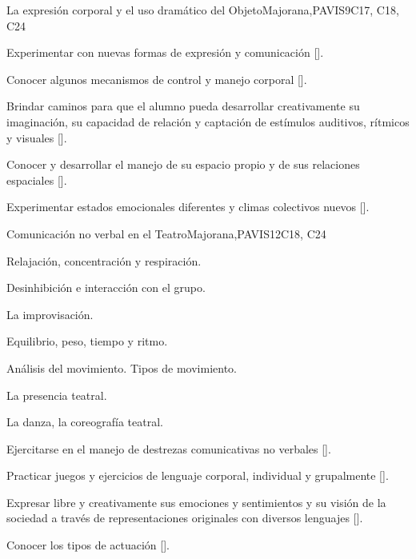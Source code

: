 \begin{syllabus}
\begin{unit}{}{La expresión corporal y el uso dramático del Objeto}{Majorana,PAVIS}{9}{C17, C18, C24}
\begin{topics}
\end{topics}
\begin{learningoutcomes}
	\item Experimentar con nuevas formas de expresión y comunicación [\Usage].
	\item Conocer algunos mecanismos de control y manejo corporal [\Usage].
	\item Brindar caminos para que el alumno pueda desarrollar creativamente su imaginación, su capacidad de relación  y captación de estímulos auditivos, rítmicos y visuales [\Usage].
	\item Conocer y desarrollar el manejo de su espacio propio  y de sus  relaciones  espaciales  [\Usage].
	\item Experimentar  estados emocionales diferentes y climas  colectivos nuevos [\Usage].
\end{learningoutcomes}
\end{unit}

\begin{unit}{}{Comunicación no verbal en el Teatro}{Majorana,PAVIS}{12}{C18, C24}
\begin{topics}
	\item Relajación, concentración y respiración.
	\item Desinhibición e interacción con el grupo.
	\item La improvisación.
	\item Equilibrio, peso, tiempo y ritmo.
	\item Análisis del movimiento. Tipos de movimiento.
	\item La presencia teatral.
	\item La danza, la coreografía teatral.

\end{topics}
\begin{learningoutcomes}
	\item Ejercitarse en el manejo de destrezas comunicativas no verbales [\Usage].
	\item Practicar juegos y ejercicios de lenguaje  corporal, individual y grupalmente [\Usage].
	\item Expresar libre y creativamente sus emociones y sentimientos y su visión de la sociedad  a través de representaciones originales con diversos lenguajes [\Usage].
	\item Conocer los tipos de actuación [\Usage].
\end{learningoutcomes}
\end{unit}


\end{syllabus}
